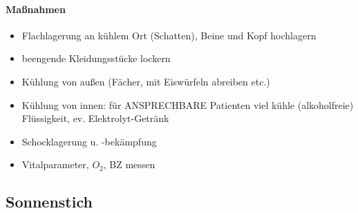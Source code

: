 \begin{gMassnahmenEnv}
\paragraph{Ma{\ss}nahmen}

\begin{itemize}
\item Flachlagerung an k\"uhlem Ort (Schatten), Beine und Kopf hochlagern
\item beengende Kleidungsst\"ucke lockern
\item K\"uhlung von au{\ss}en (Fächer, mit Eisw\"urfeln abreiben etc.)
\item K\"uhlung von innen: f\"ur ANSPRECHBARE Patienten viel k\"uhle
(alkoholfreie) Fl\"ussigkeit, ev. Elektrolyt-Getränk
\item Schocklagerung u. -bekämpfung
\item Vitalparameter, $O_2$, BZ messen
\end{itemize}
\end{gMassnahmenEnv}



\subsection{Sonnenstich}


